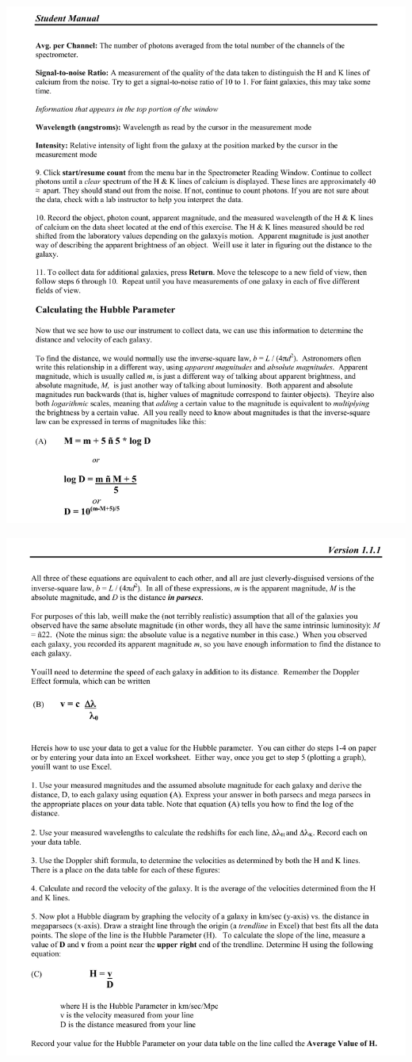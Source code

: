 \includegraphics[width=\textwidth]{hubble/hubble6.pdf}
\vfil\eject

\includegraphics[width=\textwidth]{hubble/hubble7.pdf}
\vfil\eject


